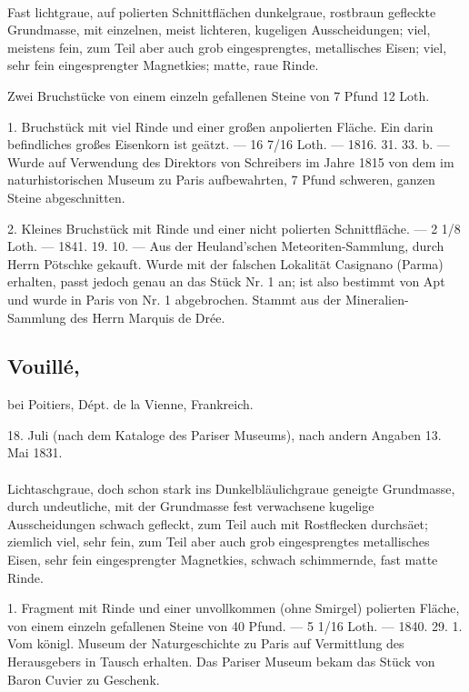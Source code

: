 \documentclass[a4paper, 11pt, oneside, polutonikogreek, german]{article}
\begin{document}
\paragraph{}
Fast lichtgraue, auf polierten Schnittflächen dunkelgraue, rostbraun gefleckte Grundmasse, mit einzelnen, meist lichteren, kugeligen Ausscheidungen; viel, meistens fein, zum Teil aber auch grob eingesprengtes, metallisches Eisen; viel, sehr fein eingesprengter Magnetkies; matte, raue Rinde.

Zwei Bruchstücke von einem einzeln gefallenen Steine von 7 Pfund 12 Loth.

1. Bruchstück mit viel Rinde und einer großen anpolierten Fläche. Ein darin befindliches großes Eisenkorn ist geätzt. — 16 7/16 Loth. — 1816. 31. 33. b. — Wurde auf Verwendung des Direktors von Schreibers im Jahre 1815 von dem im naturhistorischen Museum zu Paris aufbewahrten, 7 Pfund schweren, ganzen Steine abgeschnitten.

2. Kleines Bruchstück mit Rinde und einer nicht polierten Schnittfläche. — 2 1/8 Loth. — 1841. 19. 10. — Aus der Heuland'schen Meteoriten-Sammlung, durch Herrn Pötschke gekauft. Wurde mit der falschen Lokalität Casignano (Parma) erhalten, passt jedoch genau an das Stück Nr. 1 an; ist also bestimmt von Apt und wurde in Paris von Nr. 1 abgebrochen. Stammt aus der Mineralien-Sammlung des Herrn Marquis de Drée.
\subsection[Vouillé.]{Vouillé,}
\begin{center}
\small
bei Poitiers, Dépt. de la Vienne, Frankreich.

18. Juli (nach dem Kataloge des Pariser Museums), nach andern Angaben 13. Mai 1831.
\end{center}
\paragraph{}
Lichtaschgraue, doch schon stark ins Dunkelbläulichgraue geneigte Grundmasse, durch undeutliche, mit der Grundmasse fest verwachsene kugelige Ausscheidungen schwach gefleckt, zum Teil auch mit Rostflecken durchsäet; ziemlich viel, sehr fein, zum Teil aber auch grob eingesprengtes metallisches Eisen, sehr fein eingesprengter Magnetkies, schwach schimmernde, fast matte Rinde.

1. Fragment mit Rinde und einer unvollkommen (ohne Smirgel) polierten Fläche, von einem einzeln gefallenen Steine von 40 Pfund. — 5 1/16 Loth. — 1840. 29. 1. Vom königl. Museum der Naturgeschichte zu Paris auf Vermittlung des Herausgebers in Tausch erhalten. Das Pariser Museum bekam das Stück von Baron Cuvier zu Geschenk.
\end{document}
